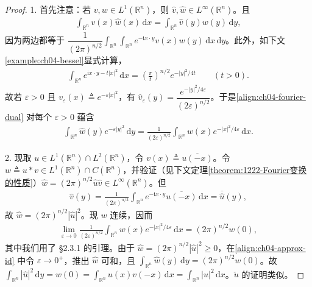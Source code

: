 \documentclass[../../main.tex]{subfiles}
\begin{document}
\begin{proof}
1. 首先注意：若 $v,w\in L^1(\mathbb{R}^n)$，则 $\widehat{v},\widehat{w}\in L^\infty(\mathbb{R}^n)$。且
\begin{align}\label{align:ch04-fourier-dual}
\int_{\mathbb{R}^n}v(x)\widehat{w}(x)\,\mathrm{d}x=\int_{\mathbb{R}^n}\widehat{v}(y)w(y)\,\mathrm{d}y,
\end{align}
因为两边都等于 $\dfrac{1}{(2\pi)^{n/2}}\int_{\mathbb{R}^n}\int_{\mathbb{R}^n}e^{-\mathrm{i}x\cdot y}v(x)w(y)\,\mathrm{d}x\,\mathrm{d}y$。此外，如下文\cref{example:ch04-bessel}显式计算，
\begin{align}\label{align:ch04-gauss-fourier}
\int_{\mathbb{R}^n}e^{\mathrm{i}x\cdot y-t|x|^2}\,\mathrm{d}x=\left(\frac{\pi}{t}\right)^{n/2}e^{-|y|^2/4t} \qquad(t>0).
\end{align}
故若 $\varepsilon>0$ 且 $v_\varepsilon(x)\triangleq e^{-\varepsilon|x|^2}$，有 $\widehat{v}_\varepsilon(y)=\dfrac{e^{-|y|^2/4\varepsilon}}{(2\varepsilon)^{n/2}}$。于是\eqref{align:ch04-fourier-dual} 对每个 $\varepsilon>0$ 蕴含
\begin{align}\label{align:ch04-approx-id}
\int_{\mathbb{R}^n}\widehat{w}(y)e^{-\varepsilon|y|^2}\,\mathrm{d}y=\frac{1}{(2\varepsilon)^{n/2}}\int_{\mathbb{R}^n}w(x)e^{-|x|^2/4\varepsilon}\,\mathrm{d}x.
\end{align}

2. 现取 $u\in L^1(\mathbb{R}^n)\cap L^2(\mathbb{R}^n)$，令 $v(x)\triangleq\overline{u(-x)}$。令 $w\triangleq u*v\in L^1(\mathbb{R}^n)\cap C(\mathbb{R}^n)$，并验证（见下文定理\cref{theorem:1222-Fourier变换的性质}）$\widehat{w}=(2\pi)^{n/2}\widehat{u}\widehat{v}\in L^\infty(\mathbb{R}^n)$。但
\begin{align*}
\widehat{v}(y)=\frac{1}{(2\pi)^{n/2}}\int_{\mathbb{R}^n}e^{-\mathrm{i}x\cdot y}\overline{u(-x)}\,\mathrm{d}x=\overline{\widehat{u}}(y),
\end{align*}
故 $\widehat{w}=(2\pi)^{n/2}|\widehat{u}|^2$。现 $w$ 连续，因而
\begin{align*}
\lim_{\varepsilon\to 0}\frac{1}{(2\varepsilon)^{n/2}}\int_{\mathbb{R}^n}w(x)e^{-|x|^2/4\varepsilon}\,\mathrm{d}x=(2\pi)^{n/2}w(0),
\end{align*}
其中我们用了 \S2.3.1 的引理。由于 $\widehat{w}=(2\pi)^{n/2}|\widehat{u}|^2\geqslant 0$，在\eqref{align:ch04-approx-id} 中令 $\varepsilon\to 0^+$，推出 $\widehat{w}$ 可和，且 $\int_{\mathbb{R}^n}\widehat{w}(y)\,\mathrm{d}y=(2\pi)^{n/2}w(0)$。故 $\int_{\mathbb{R}^n}|\widehat{u}|^2\,\mathrm{d}y=w(0)=\int_{\mathbb{R}^n}u(x)v(-x)\,\mathrm{d}x=\int_{\mathbb{R}^n}|u|^2\,\mathrm{d}x$。$\check{u}$ 的证明类似。
\end{proof}
\end{document}
